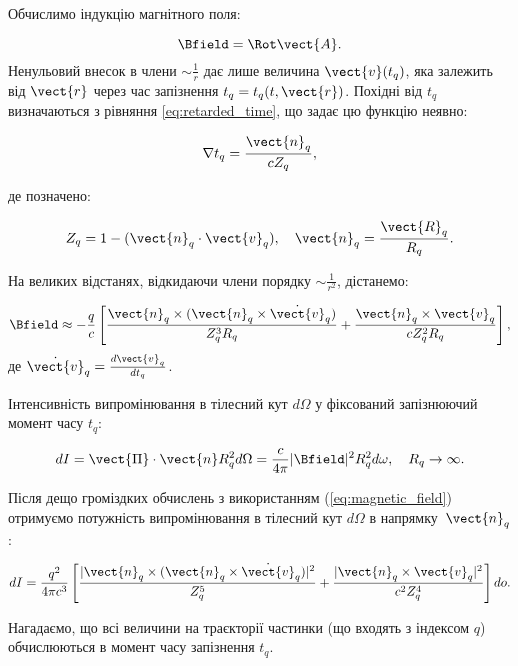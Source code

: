 Обчислимо індукцію магнітного поля:

\begin{equation*}
	\Bfield = \Rot\vect{A}.
\end{equation*}
Ненульовий внесок в члени \( \sim \frac{1}{r} \) дає лише величина \( \vect{v}(t_q) \), яка залежить від \( \vect{r} \) через час запізнення \( t_q =
t_q(t, \vect{r}) \). Похідні від \( t_q \) визначаються з рівняння \eqref{eq:retarded_time}, що задає цю функцію неявно:

\begin{equation}
	\nabla t_q = \frac{\vect{n}_q}{c Z_q},
	\label{eq:nabla_tq}
\end{equation}

де позначено:

\begin{equation*}
	Z_q = 1 - (\vect{n}_q \cdot \vect{v}_q), \quad \vect{n}_q = \frac{\vect{R}_q}{R_q}.
\end{equation*}

На великих відстанях, відкидаючи члени порядку \( \sim \frac{1}{r^2} \), дістанемо:

\begin{equation}
	\Bfield \approx -\frac{q}{c} \left[ \frac{\vect{n}_q \times (\vect{n}_q \times \dot{\vect{v}}_q)}{Z_q^3 R_q} + \frac{\vect{n}_q \times \vect{v}_q}{c
			Z_q^2 R_q} \right],
	\label{eq:magnetic_field}
\end{equation}
де \( \dot{\vect{v}}_q = \frac{d\vect{v}_q}{dt_q} \).

Інтенсивність випромінювання в тілесний кут \( d\Omega \) у фіксований запізнюючий момент часу \( t_q \):

\begin{equation*}
	dI = \vect{\Pi} \cdot \vect{n} R_q^2 d\Omega = \frac{c}{4\pi} |\Bfield|^2 R_q^2 d\omega, \quad R_q \to \infty.
\end{equation*}

Після дещо громіздких обчислень з використанням (\ref{eq:magnetic_field}) отримуємо потужність випромінювання в тілесний кут \( d\Omega \) в напрямку~\(
\vect{n}_q \):

\begin{equation}
	dI = \frac{q^2}{4\pi c^3} \left[ \frac{|\vect{n}_q \times (\vect{n}_q \times \dot{\vect{v}}_q)|^2}{Z_q^5} + \frac{|\vect{n}_q \times \vect{v}_q|^2}{c^2
			Z_q^4} \right] do.
	\label{eq:radiation_power}
\end{equation}

Нагадаємо, що всі величини на траєкторії частинки (що входять з індексом \( q \)) обчислюються в момент часу запізнення \( t_q \).

